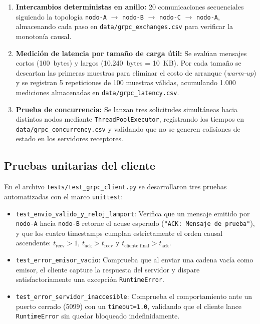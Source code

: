 \begin{enumerate}
  \item \textbf{Intercambios deterministas en anillo:} 20 comunicaciones secuenciales
        siguiendo la topología \texttt{nodo-A} $\to$ \texttt{nodo-B} $\to$
        \texttt{nodo-C} $\to$ \texttt{nodo-A}, almacenando cada paso en
        \texttt{data/grpc\_exchanges.csv} para verificar la monotonía causal.
  \item \textbf{Medición de latencia por tamaño de carga útil:} Se evalúan mensajes
        cortos (100~bytes) y largos (10.240~bytes = 10~KB). Por cada tamaño se
        descartan las primeras muestras para eliminar el costo de arranque
        (\emph{warm-up}) y se registran 5 repeticiones de 100 muestras válidas,
        acumulando 1.000 mediciones almacenadas en \texttt{data/grpc\_latency.csv}.
  \item \textbf{Prueba de concurrencia:} Se lanzan tres solicitudes simultáneas hacia
        distintos nodos mediante \texttt{ThreadPoolExecutor}, registrando los tiempos
        en \texttt{data/grpc\_concurrency.csv} y validando que no se generen
        colisiones de estado en los servidores receptores.
\end{enumerate}

\subsection{Pruebas unitarias del cliente}

En el archivo \texttt{tests/test\_grpc\_client.py} se desarrollaron tres pruebas
automatizadas con el marco \texttt{unittest}:

\begin{itemize}
  \item \texttt{test\_envio\_valido\_y\_reloj\_lamport}: Verifica que un mensaje
        emitido por \texttt{nodo-A} hacia \texttt{nodo-B} retorne el acuse esperado
        (\texttt{"ACK: Mensaje de prueba"}), y que los cuatro timestamps cumplan
        estrictamente el orden causal ascendente:
        $t_{\text{recv}} > 1$, $t_{\text{ack}} > t_{\text{recv}}$ y
        $t_{\text{cliente final}} > t_{\text{ack}}$.
  \item \texttt{test\_error\_emisor\_vacio}: Comprueba que al enviar una cadena vacía
        como emisor, el cliente capture la respuesta del servidor y dispare
        satisfactoriamente una excepción \texttt{RuntimeError}.
  \item \texttt{test\_error\_servidor\_inaccesible}: Comprueba el comportamiento ante
        un puerto cerrado (5099) con un \texttt{timeout=1.0}, validando que el
        cliente lance \texttt{RuntimeError} sin quedar bloqueado indefinidamente.
\end{itemize}

